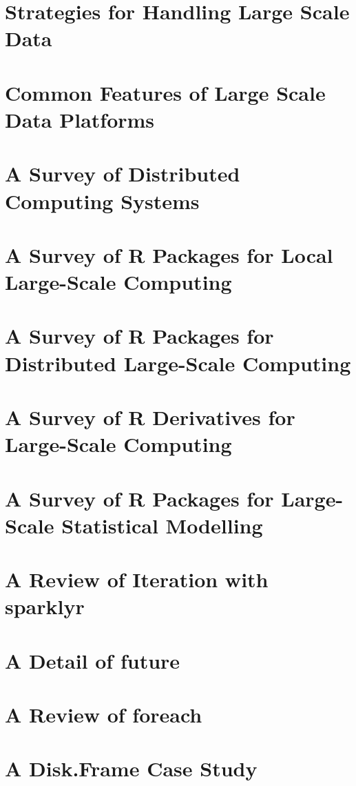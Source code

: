 
\section{Strategies for Handling Large Scale Data}

\section{Common Features of Large Scale Data Platforms}

\section{A Survey of Distributed Computing Systems}

\section{A Survey of R Packages for Local Large-Scale Computing}

\section{A Survey of R Packages for Distributed Large-Scale Computing}

\section{A Survey of R Derivatives for Large-Scale Computing}

\section{A Survey of R Packages for Large-Scale Statistical Modelling}

\section{A Review of Iteration with sparklyr}

\section{A Detail of future}

\section{A Review of foreach}

\section{A Disk.Frame Case Study}

